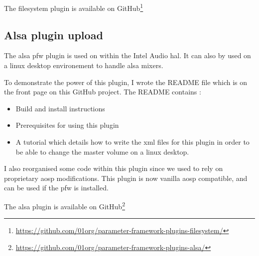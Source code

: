The filesystem plugin is available on \gls{GitHub}\footnote{\url{https://github.com/01org/parameter-framework-plugins-filesystem/}}

\subsection{Alsa plugin upload}

The \gls{alsa} \gls{pfw} plugin is used on within the Intel Audio \gls{hal}. It can also by used
on a linux desktop environement to handle \gls{alsa} mixers.

To demonstrate the power of this plugin, I wrote the README file which is on the
front page on this \gls{GitHub} project.  The README contains :
\begin{itemize}
    \item Build and install instructions
    \item Prerequisites for using this plugin
    \item A tutorial which details how to write the \gls{xml} files for this
    plugin in order to be able to change the master volume on a linux desktop.
\end{itemize}
I also reorganised some code within this plugin since we used to rely on proprietary \gls{aosp} modifications.
This plugin is now vanilla \gls{aosp} compatible, and can be used if the \gls{pfw} is installed.

The \gls{alsa} plugin is available on \gls{GitHub}\footnote{\url{https://github.com/01org/parameter-framework-plugins-alsa/}}
